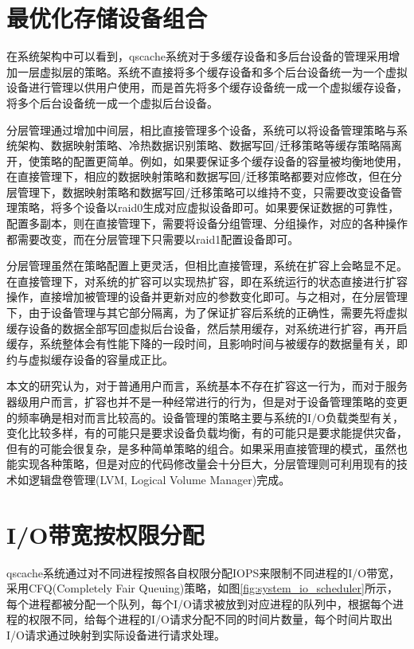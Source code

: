 \section{最优化存储设备组合}

\label{sec:multi-cache_to_multi-backend}

在系统架构中可以看到，qscache系统对于多缓存设备和多后台设备的管理采用增加一层虚拟层的策略。系统不直接将多个缓存设备和多个后台设备统一为一个虚拟设备进行管理以供用户使用，而是首先将多个缓存设备统一成一个虚拟缓存设备，将多个后台设备统一成一个虚拟后台设备。

分层管理通过增加中间层，相比直接管理多个设备，系统可以将设备管理策略与系统架构、数据映射策略、冷热数据识别策略、数据写回/迁移策略等缓存策略隔离开，使策略的配置更简单。例如，如果要保证多个缓存设备的容量被均衡地使用，在直接管理下，相应的数据映射策略和数据写回/迁移策略都要对应修改，但在分层管理下，数据映射策略和数据写回/迁移策略可以维持不变，只需要改变设备管理策略，将多个设备以raid0生成对应虚拟设备即可。如果要保证数据的可靠性，配置多副本，则在直接管理下，需要将设备分组管理、分组操作，对应的各种操作都需要改变，而在分层管理下只需要以raid1配置设备即可。

分层管理虽然在策略配置上更灵活，但相比直接管理，系统在扩容上会略显不足。在直接管理下，对系统的扩容可以实现热扩容，即在系统运行的状态直接进行扩容操作，直接增加被管理的设备并更新对应的参数变化即可。与之相对，在分层管理下，由于设备管理与其它部分隔离，为了保证扩容后系统的正确性，需要先将虚拟缓存设备的数据全部写回虚拟后台设备，然后禁用缓存，对系统进行扩容，再开启缓存，系统整体会有性能下降的一段时间，且影响时间与被缓存的数据量有关，即约与虚拟缓存设备的容量成正比。

本文的研究认为，对于普通用户而言，系统基本不存在扩容这一行为，而对于服务器级用户而言，扩容也并不是一种经常进行的行为，但是对于设备管理策略的变更的频率确是相对而言比较高的。设备管理的策略主要与系统的I/O负载类型有关，变化比较多样，有的可能只是要求设备负载均衡，有的可能只是要求能提供灾备，但有的可能会很复杂，是多种简单策略的组合。如果采用直接管理的模式，虽然也能实现各种策略，但是对应的代码修改量会十分巨大，分层管理则可利用现有的技术如逻辑盘卷管理(LVM, Logical Volume Manager)\cite{wada2009logical}完成。

\section{I/O带宽按权限分配}

qscache系统通过对不同进程按照各自权限分配IOPS来限制不同进程的I/O带宽，采用CFQ(Completely Fair Queuing)策略，如图\ref{fig:system_io_scheduler}所示，每个进程都被分配一个队列，每个I/O请求被放到对应进程的队列中，根据每个进程的权限不同，给每个进程的I/O请求分配不同的时间片数量，每个时间片取出I/O请求通过映射到实际设备进行请求处理。

